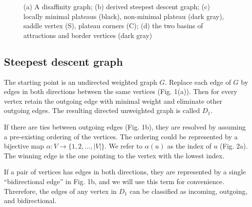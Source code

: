 \documentclass{article}\usepackage{times}
\begin{document}
\begin{figure}

  \protect\caption{(a) A disaffinity graph; (b) derived steepest
    descent graph; (c) locally minimal plateaus (black), non-minimal
    plateau (dark gray), saddle vertex (S), plateau corners (C); (d)
    the two basins of attractions and border vertices (dark gray)}
\end{figure}

\subsection{Steepest descent graph}
The starting point is an undirected weighted graph $G$.  Replace each
edge of $G$ by edges in both directions between the same vertices
(Fig. 1(a)).  Then for every vertex retain the outgoing edge with
minimal weight and eliminate other outgoing edges.  The resulting
directed unweighted graph is called $D_1$.

If there are ties between outgoing edges (Fig. 1b), they are resolved
by assuming a pre-existing ordering of the vertices.  The ordering
could be represented by a bijective map
$\alpha:V\to\{1,2,...,|V|\}$. We refer to $\alpha(u)$ as the index of
$u$ (Fig. 2a).  The winning edge is the one pointing to the vertex
with the lowest index.

If a pair of vertices has edges in both directions, they are
represented by a single ``bidirectional edge'' in Fig. 1b, and we will
use this term for convenience.  Threrefore, the edges of any vertex in
$D_1$ can be classified as incoming, outgoing, and bidirectional.
\end{document}
